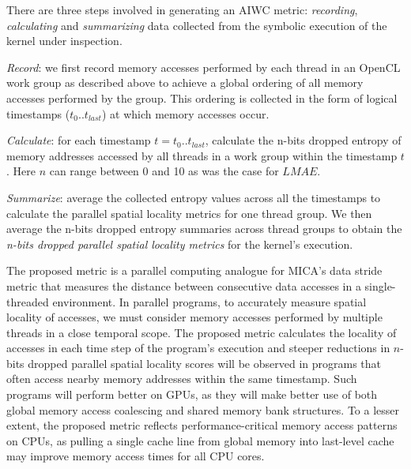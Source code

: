 \documentclass[review=false, sigchi]{acmart}
\begin{document}
	There are three steps involved in generating an AIWC metric: \textit{recording}, \textit{calculating} and \textit{summarizing} data collected from the symbolic execution of the kernel under inspection.
	
	\textit{Record}: we first record memory accesses performed by each thread in an OpenCL work group as described above to achieve a global ordering of all memory accesses performed by the group.
	This ordering is collected in the form of logical timestamps ($t_0 .. t_{last}$) at which memory accesses occur.
	
	\textit{Calculate}: for each timestamp $t = t_0 .. t_{last}$, calculate the n-bits dropped entropy of memory addresses accessed by all threads in a work group within the timestamp $t$. Here $n$ can range between 0 and 10 as was the case for $LMAE$.
	
	\textit{Summarize}: average the collected entropy values across all the timestamps to calculate the parallel spatial locality metrics for one thread group. We then average the n-bits dropped entropy summaries across thread groups to obtain the \textit{n-bits dropped parallel spatial locality metrics} for the kernel's execution.
	
	

	The proposed metric is a parallel computing analogue for MICA's data stride metric that measures the distance between consecutive data accesses in a single-threaded environment. 
	In parallel programs, to accurately measure spatial locality of accesses, we must consider memory accesses performed by multiple threads in a close temporal scope. 
	The proposed metric calculates the locality of accesses in each time step of the program's execution and steeper reductions in $n$-bits dropped parallel spatial locality scores will be observed in programs that often access nearby memory addresses within the same timestamp.
	Such programs will perform better on GPUs, as they will make better use of both global memory access coalescing and shared memory bank structures.
	To a lesser extent, the proposed metric reflects performance-critical memory access patterns on CPUs, as pulling a single cache line from global memory into last-level cache may improve memory access times for all CPU cores.
	
\end{document}
